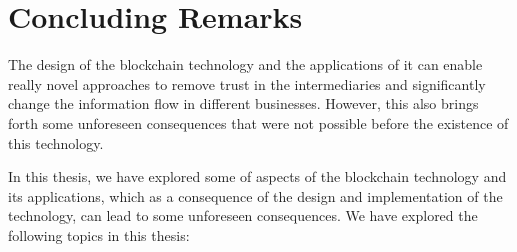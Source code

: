 \chapter{Concluding Remarks} \label{sec:conclusion}


The design of the blockchain technology and the applications of it can enable really novel approaches to remove trust in the intermediaries and significantly change the information flow in different businesses. However, this also brings forth some unforeseen consequences that were not possible before the existence of this technology.

In this thesis, we have explored some of aspects of the blockchain technology and its applications, which as a consequence of the design and implementation of the technology, can lead to some unforeseen consequences. We have explored the following topics in this thesis:  


